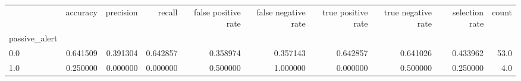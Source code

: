 \begin{tabular}{lrrrrrrrrr}
\toprule
{} &  accuracy &  precision &    recall &  false positive rate &  false negative rate &  true positive rate &  true negative rate &  selection rate &  count \\
passive\_alert &           &            &           &                      &                      &                     &                     &                 &        \\
\midrule
0.0           &  0.641509 &   0.391304 &  0.642857 &             0.358974 &             0.357143 &            0.642857 &            0.641026 &        0.433962 &   53.0 \\
1.0           &  0.250000 &   0.000000 &  0.000000 &             0.500000 &             1.000000 &            0.000000 &            0.500000 &        0.250000 &    4.0 \\
\bottomrule
\end{tabular}
